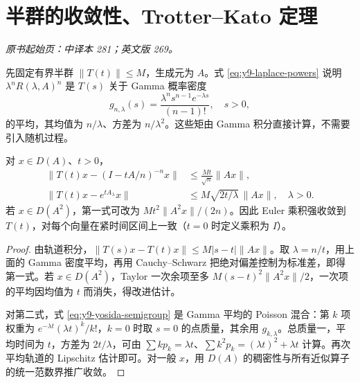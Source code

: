 \section{半群的收敛性、Trotter--Kato 定理}\label{sec:yosida-09-12}
\noindent\textit{原书起始页：中译本 281；英文版 269。}

先固定有界半群 $\|T(t)\|\le M$，生成元为 $A$。式 \eqref{eq:y9-laplace-powers} 说明 $\lambda^nR(\lambda,A)^n$ 是 $T(s)$ 关于 Gamma 概率密度
\[
 g_{n,\lambda}(s)=\frac{\lambda^ns^{n-1}e^{-\lambda s}}{(n-1)!},\quad s>0,
\]
的平均，其均值为 $n/\lambda$、方差为 $n/\lambda^2$。这些矩由 Gamma 积分直接计算，不需要引入随机过程。

\begin{lemma}\label{lem:y9-approx-error}
对 $x\in D(A)$、$t>0$，
\begin{align}
 \|T(t)x-(I-tA/n)^{-n}x\|&\le\frac{Mt}{\sqrt n}\|Ax\|,\label{eq:y9-euler-error}\\
 \|T(t)x-e^{tA_\lambda}x\|&\le M\sqrt{2t/\lambda}\,\|Ax\|,\quad\lambda>0.\label{eq:y9-yosida-error}
\end{align}
若 $x\in D(A^2)$，第一式可改为 $Mt^2\|A^2x\|/(2n)$。因此 Euler 乘积强收敛到 $T(t)$，对每个向量在紧时间区间上一致（$t=0$ 时定义乘积为 $I$）。
\end{lemma}
\begin{proof}
由轨道积分，$\|T(s)x-T(t)x\|\le M|s-t|\|Ax\|$。取 $\lambda=n/t$，用上面的 Gamma 密度平均，再用 Cauchy--Schwarz 把绝对偏差控制为标准差，即得第一式。若 $x\in D(A^2)$，Taylor 一次余项至多 $M(s-t)^2\|A^2x\|/2$，一次项的平均因均值为 $t$ 而消失，得改进估计。

对第二式，式 \eqref{eq:y9-yosida-semigroup} 是 Gamma 平均的 Poisson 混合：第 $k$ 项权重为 $e^{-\lambda t}(\lambda t)^k/k!$，$k=0$ 时取 $s=0$ 的点质量，其余用 $g_{k,\lambda}$。总质量一，平均时间为 $t$，方差为 $2t/\lambda$，可由 $\sum k p_k=\lambda t$、$\sum k^2p_k=(\lambda t)^2+\lambda t$ 计算。再次平均轨道的 Lipschitz 估计即可。对一般 $x$，用 $D(A)$ 的稠密性与所有近似算子的统一范数界推广收敛。
\end{proof}

